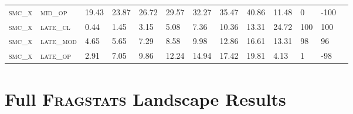 \begin{landscape}
\begin{table}[!htbp]
\begin{tabular}{@{}lllllllllllll@{}}
\footnotesize \textsc{smc\_x}      & \footnotesize \textsc{mid\_op   }     & \footnotesize 19.43           & \footnotesize 23.87           & \footnotesize 26.72            & \footnotesize 29.57            & \footnotesize 32.27            & \footnotesize 35.47           & \footnotesize 40.86        & \footnotesize 11.48    & \footnotesize 0    & \footnotesize -100     \\
\footnotesize \textsc{smc\_x}      & \footnotesize \textsc{late\_cl  }     & \footnotesize 0.44           & \footnotesize 1.45           & \footnotesize 3.15            & \footnotesize 5.08            & \footnotesize 7.36            & \footnotesize 10.36           & \footnotesize 13.31        & \footnotesize 24.72    & \footnotesize 100    & \footnotesize 100     \\
\footnotesize \textsc{smc\_x}      & \footnotesize \textsc{late\_mod }     & \footnotesize 4.65           & \footnotesize 5.65           & \footnotesize 7.29            & \footnotesize 8.58            & \footnotesize 9.98            & \footnotesize 12.86           & \footnotesize 16.61        & \footnotesize 13.31    & \footnotesize 98    & \footnotesize 96     \\
\footnotesize \textsc{smc\_x}      & \footnotesize \textsc{late\_op  }     & \footnotesize 2.91           & \footnotesize 7.05           & \footnotesize 9.86            & \footnotesize 12.24            & \footnotesize 14.94            & \footnotesize 17.42           & \footnotesize 19.81        & \footnotesize 4.13    & \footnotesize 1    & \footnotesize -98     \\ \bottomrule 
\end{tabular}
\end{table}
\end{landscape}



\chapter{Full \textsc{Fragstats} Landscape Results}
\label{sec:full-land-results}

